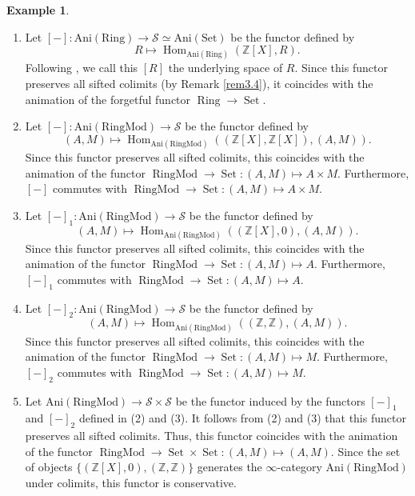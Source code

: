 \documentclass[11pt, a4paper]{amsart}
\theoremstyle{plain}
\theoremstyle{definition}
\newtheorem{example}[theorem]{Example}
\begin{document}
\begin{example}\label{exa3.14}
    \begin{enumerate}
        \item Let $[-]:\operatorname{Ani(Ring)}\to \mathcal S\simeq \operatorname{Ani(Set)}$ be the functor defined by \[R\mapsto \operatorname{Hom}_{\operatorname{Ani(Ring)}}(\mathbb Z[X],R).\] Following \cite[Appendix A]{BL22}, we call this $[R]$ the underlying space of $R$. Since this functor preserves all sifted colimits (by Remark \ref{rem3.4}), it coincides with the animation of the forgetful functor $\operatorname{Ring}\to \operatorname{Set}$. 
        \item Let $[-]:\operatorname{Ani(RingMod)}\to \mathcal S$ be the functor defined by \[(A,M)\mapsto \operatorname{Hom}_{\operatorname{Ani(RingMod)}}((\mathbb Z[X],\mathbb Z[X]),(A,M)).\] Since this functor preserves all sifted colimits, this coincides with the animation of the functor $\operatorname{RingMod}\to \operatorname{Set}:(A,M)\mapsto A\times M$. Furthermore, $[-]$ commutes with $\operatorname{RingMod}\to \operatorname{Set}:(A,M)\mapsto A\times M$.
        \item Let $[-]_1:\operatorname{Ani(RingMod)}\to \mathcal S$ be the functor defined by \[(A,M)\mapsto \operatorname{Hom}_{\operatorname{Ani(RingMod)}}((\mathbb Z[X],0),(A,M)).\] Since this functor preserves all sifted colimits, this coincides with the animation of the functor $\operatorname{RingMod}\to \operatorname{Set}:(A,M)\mapsto A$. Furthermore, $[-]_1$ commutes with $\operatorname{RingMod}\to \operatorname{Set}:(A,M)\mapsto A$.
        \item Let $[-]_2:\operatorname{Ani(RingMod)}\to \mathcal S$ be the functor defined by \[(A,M)\mapsto \operatorname{Hom}_{\operatorname{Ani(RingMod)}}((\mathbb Z,\mathbb Z),(A,M)).\] Since this functor preserves all sifted colimits, this coincides with the animation of the functor $\operatorname{RingMod}\to \operatorname{Set}:(A,M)\mapsto M$. Furthermore, $[-]_2$ commutes with $\operatorname{RingMod}\to \operatorname{Set}:(A,M)\mapsto M$.
        \item Let $\operatorname{Ani(RingMod)}\to \mathcal S\times \mathcal S$ be the functor induced by the functors $[-]_1$ and $[-]_2$ defined in (2) and (3). It follows from (2) and (3) that this functor preserves all sifted colimits. Thus, this functor coincides with the animation of the functor $\operatorname{RingMod}\to \operatorname{Set}\times\operatorname{Set}:(A,M)\mapsto (A,M)$. Since the set of objects $\{(\mathbb Z[X],0),(\mathbb Z,\mathbb Z)\}$ generates the $\infty$-category $\operatorname{Ani(RingMod)}$ under colimits, this functor is conservative.
    \end{enumerate}
\end{example}
\end{document}
